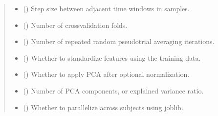 \documentclass[letterpaper,10pt,english]{sphinxhowto}
\begin{document}
\begin{fulllineitems}
\begin{quote}
\begin{description}
\begin{itemize}
\item {} 
\sphinxAtStartPar
{} (\sphinxstyleliteralemphasis{\sphinxupquote{, }}) \textendash{} Step size between adjacent time windows in samples.

\item {} 
\sphinxAtStartPar
{} (\sphinxstyleliteralemphasis{\sphinxupquote{, }}) \textendash{} Number of cross\sphinxhyphen{}validation folds.

\item {} 
\sphinxAtStartPar
{} (\sphinxstyleliteralemphasis{\sphinxupquote{, }}) \textendash{} Number of repeated random pseudo\sphinxhyphen{}trial averaging iterations.

\item {} 
\sphinxAtStartPar
{} (\sphinxstyleliteralemphasis{\sphinxupquote{, }}) \textendash{} Whether to standardize features using the training data.

\item {} 
\sphinxAtStartPar
{} (\sphinxstyleliteralemphasis{\sphinxupquote{, }}) \textendash{} Whether to apply PCA after optional normalization.

\item {} 
\sphinxAtStartPar
{} (\sphinxstyleliteralemphasis{\sphinxupquote{, }}) \textendash{} Number of PCA components, or explained variance ratio.

\item {} 
\sphinxAtStartPar
{} (\sphinxstyleliteralemphasis{\sphinxupquote{, }}) \textendash{} Whether to parallelize across subjects using joblib.


\end{itemize}
\end{description}
\end{quote}
\end{fulllineitems}
\end{document}

